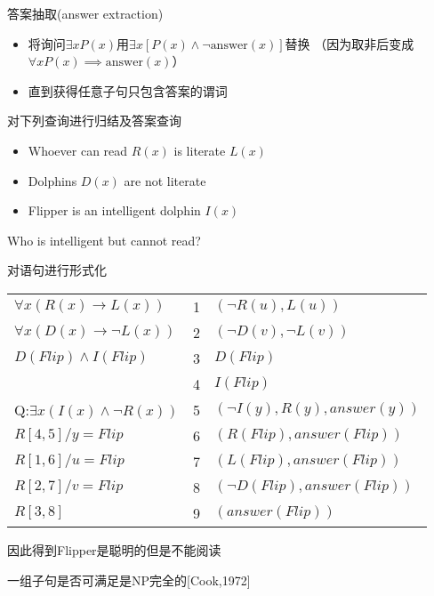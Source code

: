 答案抽取(answer extraction)
\begin{itemize}
\item 将询问$\exists xP(x)$用$\exists x[P(x)\land\lnot\text{answer}(x)]$替换
（因为取非后变成$\forall x P(x)\implies \text{answer}(x)$）
\item 直到获得任意子句只包含答案的谓词
\end{itemize}
\begin{example}
对下列查询进行归结及答案查询
\begin{itemize}
	\item Whoever can read $R(x)$ is literate $L(x)$
	\item Dolphins $D(x)$ are not literate
	\item Flipper is an intelligent dolphin $I(x)$
\end{itemize}
Who is intelligent but cannot read?
\end{example}
\begin{analysis}
对语句进行形式化
\begin{center}
\begin{tabular}{lll}
$\forall x (R(x)\to L(x))$ & 1 & $(\lnot R(u),L(u))$\\
$\forall x (D(x)\to \lnot L(x))$ & 2 & $(\lnot D(v),\lnot L(v))$\\
$D(Flip)\land I(Flip)$ & 3 & $D(Flip)$\\
 & 4 & $I(Flip)$\\
Q:$\exists x (I(x)\land\lnot R(x))$ & 5 & $(\lnot I(y),R(y),answer(y))$\\\hline 
$R[4,5]/y=Flip$ & 6 & $(R(Flip),answer(Flip))$\\
$R[1,6]/u=Flip$ & 7 & $(L(Flip),answer(Flip))$\\
$R[2,7]/v=Flip$ & 8 & $(\lnot D(Flip),answer(Flip))$\\
$R[3,8]$ & 9 & $(answer(Flip))$
\end{tabular}
\end{center}
因此得到Flipper是聪明的但是不能阅读
\end{analysis}

一组子句是否可满足是NP完全的[Cook,1972]
